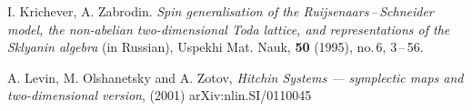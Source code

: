 \documentclass[a4paper,11pt]{article}
\theoremstyle{plain}
\theoremstyle{remark}
\begin{document}
\begin{thebibliography}{9}
 I. Krichever, A. Zabrodin.
\emph{Spin generalisation of the Ruijsenaars\,--\,Schneider model,
the non-abelian two-dimensional Toda lattice, and representations of
the Sklyanin algebra} (in Russian),
Uspekhi Mat. Nauk, {\bfseries 50} (1995), no.\,6, 3\,--\,56.

 A. Levin, M. Olshanetsky and A. Zotov,
\emph{Hitchin Systems --- symplectic maps and two-dimensional version},
(2001) arXiv:nlin.SI/0110045

\end{thebibliography}
\end{document}
